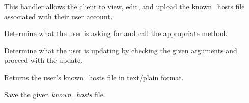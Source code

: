 \documentclass[letterpaper,10pt,openany]{sphinxmanual}
\begin{document}

\begin{fulllineitems}
\label{Applications/terminal/plugin_ssh:ssh.KnownHostsHandler}
This handler allows the client to view, edit, and upload the known\_hosts
file associated with their user account.

\begin{fulllineitems}
\label{Applications/terminal/plugin_ssh:ssh.KnownHostsHandler.get}
Determine what the user is asking for and call the appropriate method.

\end{fulllineitems}


\begin{fulllineitems}
\label{Applications/terminal/plugin_ssh:ssh.KnownHostsHandler.post}
Determine what the user is updating by checking the given arguments and
proceed with the update.

\end{fulllineitems}


\begin{fulllineitems}
\label{Applications/terminal/plugin_ssh:ssh.KnownHostsHandler._return_known_hosts}
Returns the user's known\_hosts file in text/plain format.

\end{fulllineitems}


\begin{fulllineitems}
\label{Applications/terminal/plugin_ssh:ssh.KnownHostsHandler._save_known_hosts}
Save the given \emph{known\_hosts} file.

\end{fulllineitems}


\end{fulllineitems}
\end{document}
